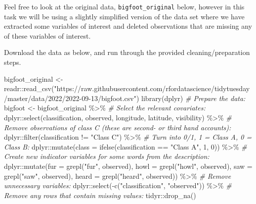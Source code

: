 \documentclass[
]{article}
\newenvironment{Shaded}{\begin{snugshade}}{\end{snugshade}}
\newcommand{\AttributeTok}[1]{\textcolor[rgb]{0.77,0.63,0.00}{#1}}
\newcommand{\CommentTok}[1]{\textcolor[rgb]{0.56,0.35,0.01}{\textit{#1}}}
\newcommand{\DecValTok}[1]{\textcolor[rgb]{0.00,0.00,0.81}{#1}}
\newcommand{\FunctionTok}[1]{\textcolor[rgb]{0.00,0.00,0.00}{#1}}
\newcommand{\NormalTok}[1]{#1}
\newcommand{\OtherTok}[1]{\textcolor[rgb]{0.56,0.35,0.01}{#1}}
\newcommand{\SpecialCharTok}[1]{\textcolor[rgb]{0.00,0.00,0.00}{#1}}
\newcommand{\StringTok}[1]{\textcolor[rgb]{0.31,0.60,0.02}{#1}}
\begin{document}
Feel free to look at the original data, \texttt{bigfoot\_original}
below, however in this task we will be using a slightly simplified
version of the data set where we have extracted some variables of
interest and deleted observations that are missing any of these
variables of interest.

Download the data as below, and run through the provided
cleaning/preparation steps.

\begin{Shaded}
\begin{Highlighting}[]
\NormalTok{bigfoot\_original }\OtherTok{\textless{}{-}}\NormalTok{ readr}\SpecialCharTok{::}\FunctionTok{read\_csv}\NormalTok{(}\StringTok{"https://raw.githubusercontent.com/rfordatascience/tidytuesday/master/data/2022/2022{-}09{-}13/bigfoot.csv"}\NormalTok{)}
\FunctionTok{library}\NormalTok{(dplyr)}
\CommentTok{\# Prepare the data:}
\NormalTok{bigfoot }\OtherTok{\textless{}{-}}\NormalTok{ bigfoot\_original }\SpecialCharTok{\%\textgreater{}\%}
  \CommentTok{\# Select the relevant covariates:}
\NormalTok{  dplyr}\SpecialCharTok{::}\FunctionTok{select}\NormalTok{(classification, observed, longitude, latitude, visibility) }\SpecialCharTok{\%\textgreater{}\%}
  \CommentTok{\# Remove observations of class C (these are second{-} or third hand accounts):}
\NormalTok{  dplyr}\SpecialCharTok{::}\FunctionTok{filter}\NormalTok{(classification }\SpecialCharTok{!=} \StringTok{"Class C"}\NormalTok{) }\SpecialCharTok{\%\textgreater{}\%}
  \CommentTok{\# Turn into 0/1, 1 = Class A, 0 = Class B:}
\NormalTok{  dplyr}\SpecialCharTok{::}\FunctionTok{mutate}\NormalTok{(}\AttributeTok{class =} \FunctionTok{ifelse}\NormalTok{(classification }\SpecialCharTok{==} \StringTok{"Class A"}\NormalTok{, }\DecValTok{1}\NormalTok{, }\DecValTok{0}\NormalTok{)) }\SpecialCharTok{\%\textgreater{}\%}
  \CommentTok{\# Create new indicator variables for some words from the description:}
\NormalTok{  dplyr}\SpecialCharTok{::}\FunctionTok{mutate}\NormalTok{(}\AttributeTok{fur =} \FunctionTok{grepl}\NormalTok{(}\StringTok{"fur"}\NormalTok{, observed),}
                \AttributeTok{howl =} \FunctionTok{grepl}\NormalTok{(}\StringTok{"howl"}\NormalTok{, observed),}
                \AttributeTok{saw =} \FunctionTok{grepl}\NormalTok{(}\StringTok{"saw"}\NormalTok{, observed),}
                \AttributeTok{heard =} \FunctionTok{grepl}\NormalTok{(}\StringTok{"heard"}\NormalTok{, observed)) }\SpecialCharTok{\%\textgreater{}\%}
  \CommentTok{\# Remove unnecessary variables:}
\NormalTok{  dplyr}\SpecialCharTok{::}\FunctionTok{select}\NormalTok{(}\SpecialCharTok{{-}}\FunctionTok{c}\NormalTok{(}\StringTok{"classification"}\NormalTok{, }\StringTok{"observed"}\NormalTok{)) }\SpecialCharTok{\%\textgreater{}\%}
  \CommentTok{\# Remove any rows that contain missing values:}
\NormalTok{  tidyr}\SpecialCharTok{::}\FunctionTok{drop\_na}\NormalTok{()}
\end{Highlighting}
\end{Shaded}
\end{document}
